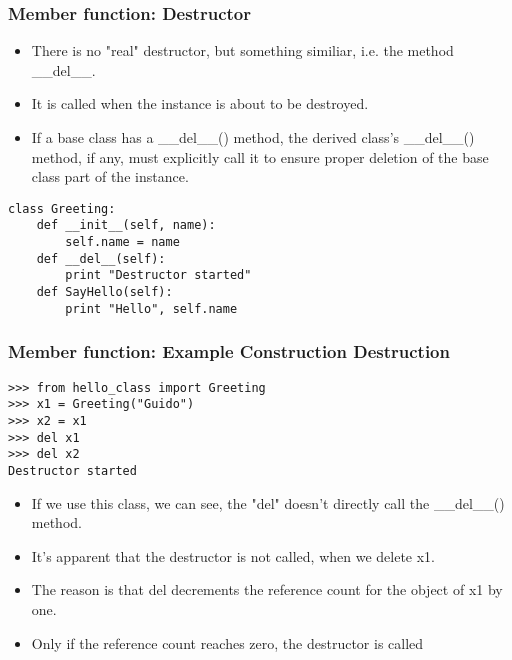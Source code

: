 \begin{frame}[fragile]\frametitle{Member function: Destructor}
   \begin{itemize}
  \item There is no "real" destructor, but something similiar, i.e. the method \_\_del\_\_. 
  \item It is called when the instance is about to be destroyed. 
  \item If a base class has a \_\_del\_\_() method, the derived class's \_\_del\_\_() method, if any, must explicitly call it to ensure proper deletion of the base class part of the instance. 
   \end{itemize}
   
   
\begin{lstlisting}
class Greeting:
    def __init__(self, name):
        self.name = name
    def __del__(self):
        print "Destructor started"
    def SayHello(self):
        print "Hello", self.name

\end{lstlisting}   
\end{frame}

\begin{frame}[fragile]\frametitle{Member function: Example Construction Destruction}
   
\begin{lstlisting}
>>> from hello_class import Greeting
>>> x1 = Greeting("Guido")
>>> x2 = x1
>>> del x1
>>> del x2
Destructor started   
\end{lstlisting}
   \begin{itemize}
  \item If we use this class, we can see, the "del" doesn't directly call the \_\_del\_\_() method. 
  \item It's apparent that the destructor is not called, when we delete x1. 
  \item The reason is that del decrements the reference count for the object of x1 by one. 
  \item Only if the reference count reaches zero, the destructor is called
     \end{itemize}
\end{frame}




